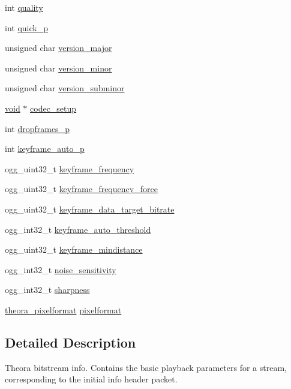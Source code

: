 \begin{DoxyCompactItemize}
int \hyperlink{structtheora__info_a71a4748a5f31bd58d0e403b7806c980d}{quality}
\item 
int \hyperlink{structtheora__info_a2dfae4fd175dbd19254eaf0697778ff5}{quick\+\_\+p}
\item 
unsigned char \hyperlink{structtheora__info_a7c5ebb9e6700aaef87f29f7c6074e474}{version\+\_\+major}
\item 
unsigned char \hyperlink{structtheora__info_a75eda4f30270d833c7b9dba43932a06a}{version\+\_\+minor}
\item 
unsigned char \hyperlink{structtheora__info_aa07967ecd6e20bd2928ead42b6397b3d}{version\+\_\+subminor}
\item 
\hyperlink{png_8h_ac9c84fa68bbad002983e35ce3663c686}{void} $\ast$ \hyperlink{structtheora__info_a719a1d77a4a3bfeab79aa5747dbbb04c}{codec\+\_\+setup}
\item 
int \hyperlink{structtheora__info_af294db65a8363a0bcf43f4727763b291}{dropframes\+\_\+p}
\item 
int \hyperlink{structtheora__info_a23648173369174f687085c0ce85ef30e}{keyframe\+\_\+auto\+\_\+p}
\item 
ogg\+\_\+uint32\+\_\+t \hyperlink{structtheora__info_a03e1b3e337af5f9dabaaaeb9050f145a}{keyframe\+\_\+frequency}
\item 
ogg\+\_\+uint32\+\_\+t \hyperlink{structtheora__info_ad9d2e22c44a53473010e6d1042dfe0d8}{keyframe\+\_\+frequency\+\_\+force}
\item 
ogg\+\_\+uint32\+\_\+t \hyperlink{structtheora__info_a588942d1ee90a26a7effdf6a0e98b9ce}{keyframe\+\_\+data\+\_\+target\+\_\+bitrate}
\item 
ogg\+\_\+int32\+\_\+t \hyperlink{structtheora__info_a95cb8958e29ad3d24047ee8f9e7fd99b}{keyframe\+\_\+auto\+\_\+threshold}
\item 
ogg\+\_\+uint32\+\_\+t \hyperlink{structtheora__info_aa79ca8c0e77a884d4487fd627fae32e9}{keyframe\+\_\+mindistance}
\item 
ogg\+\_\+int32\+\_\+t \hyperlink{structtheora__info_ac4789034f547b57d1075e035050eeed9}{noise\+\_\+sensitivity}
\item 
ogg\+\_\+int32\+\_\+t \hyperlink{structtheora__info_a3fb695de2b2f56dd0203b9e2eb0df1cc}{sharpness}
\item 
\hyperlink{group__oldfuncs_gae169da05bfaaf4e964a6866552d45079}{theora\+\_\+pixelformat} \hyperlink{structtheora__info_a65ab4376ab5242ee82e06c78fb7008ab}{pixelformat}
\end{DoxyCompactItemize}


\subsection{Detailed Description}
Theora bitstream info. Contains the basic playback parameters for a stream, corresponding to the initial \textquotesingle{}info\textquotesingle{} header packet.

